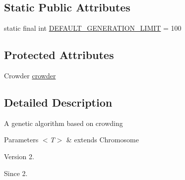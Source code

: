 \subsection*{Static Public Attributes}
\begin{DoxyCompactItemize}
\item 
static final int \hyperlink{classjenes_1_1algorithms_1_1_crowding_g_a_3_01_t_01extends_01_chromosome_01_4_afb96c2e73129293b45044998e3614c06}{D\-E\-F\-A\-U\-L\-T\-\_\-\-G\-E\-N\-E\-R\-A\-T\-I\-O\-N\-\_\-\-L\-I\-M\-I\-T} = 100
\end{DoxyCompactItemize}
\subsection*{Protected Attributes}
\begin{DoxyCompactItemize}
\item 
Crowder \hyperlink{classjenes_1_1algorithms_1_1_crowding_g_a_3_01_t_01extends_01_chromosome_01_4_aa747112afbb20cb4faec643ccc73e396}{crowder}
\end{DoxyCompactItemize}


\subsection{Detailed Description}
A genetic algorithm based on crowding


\begin{DoxyParams}{Parameters}
{\em $<$\-T$>$} & extends Chromosome\\
\hline
\end{DoxyParams}
\begin{DoxyVersion}{Version}
2. 
\end{DoxyVersion}
\begin{DoxySince}{Since}
2. 
\end{DoxySince}


